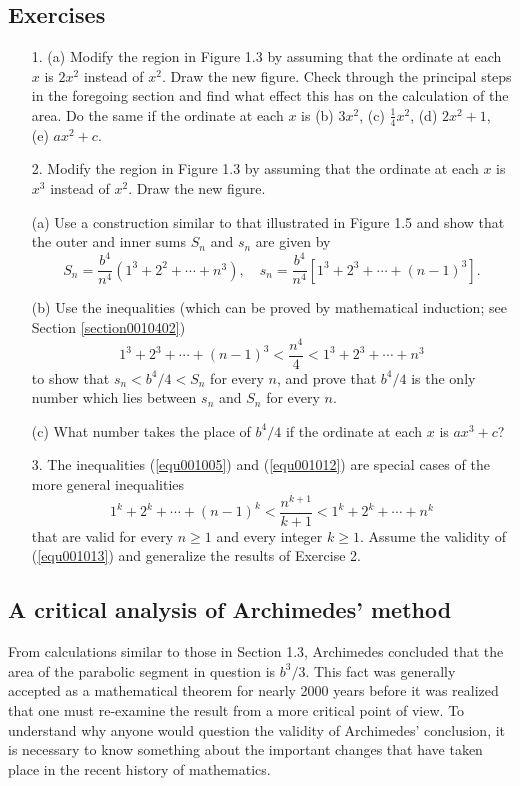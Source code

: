 \documentclass[cn,11pt,chinese]{elegantbook}
\numberwithin{equation}{section}
\begin{document}
\subsection{Exercises}
\begin{enumerate}
\item[1.] (a) Modify the region in Figure 1.3 by assuming that the ordinate at each $x$ is $2x^2$ instead of $x^2$. Draw the new figure. Check through the principal steps in the foregoing section and find what effect this has on the calculation of the area. Do the same if the ordinate at each $x$ is (b) $3x^2$, (c) $\frac{1}{4}x^2$, (d) $2x^2+1$, (e) $ax^2+c$.

\item[2.] Modify the region in Figure 1.3 by assuming that the ordinate at each $x$ is $x^3$ instead of $x^2$. Draw the new figure.

(a) Use a construction similar to that illustrated in Figure 1.5 and show that the outer and inner sums $S_n$ and $s_n$ are given by
\[
S_n = \frac{b^4}{n^4}(1^3+2^2+\cdots+n^3),\quad s_n = \frac{b^4}{n^4}[1^3+2^3+\cdots + (n-1)^3].
\]

(b) Use the inequalities (which can be proved by mathematical induction; see Section \ref{section0010402})
\begin{equation}\label{equ001012}
1^3 + 2^3 + \cdots + (n-1)^3 < \frac{n^4}{4} < 1^3 + 2^3 + \cdots + n^3
\end{equation}
to show that $s_n < b^4/4 < S_n$ for every $n$, and prove that $b^4/4$ is the only number which lies between $s_n$ and $S_n$ for every $n$.

(c) What number takes the place of $b^4/4$ if the ordinate at each $x$ is $ax^3+c$?

\item[3.] The inequalities (\ref{equ001005}) and (\ref{equ001012}) are special cases of the more general inequalities
\begin{equation}\label{equ001013}
1^k + 2^k + \cdots + (n-1)^k < \frac{n^{k+1}}{k+1} < 1^k + 2^k + \cdots + n^k
\end{equation}
that are valid for every $n \ge 1$ and every integer $k \ge 1$. Assume the validity of (\ref{equ001013}) and generalize the results of Exercise 2.
\end{enumerate}

\subsection{A critical analysis of Archimedes' method}
From calculations similar to those in Section 1.3, Archimedes concluded that the area of the parabolic segment in question is $b^3/3$. This fact was generally accepted as a mathematical theorem for nearly 2000 years before it was realized that one must re-examine the result from a more critical point of view. To understand why anyone would question the validity of Archimedes' conclusion, it is necessary to know something about the important changes that have taken place in the recent history of mathematics.
\end{document}
